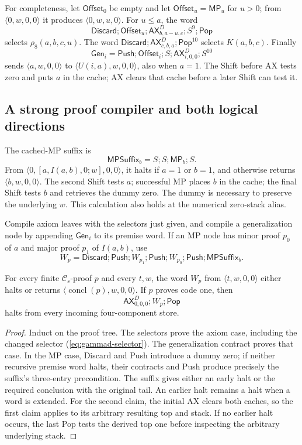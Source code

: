 For completeness, let \(\mathsf{Offset}_0\) be empty and let
\(\mathsf{Offset}_u=\mathsf{MP}_u\) for \(u>0\); from
\(\langle0,w,0,0\rangle\) it produces
\(\langle0,w,u,0\rangle\).  For \(u\le a\), the word
\[
 \mathsf{Discard};\mathsf{Offset}_u;
 \mathsf{AX}^{D}_{b,a-u,c};S^9;\mathsf{Pop}
\]
selects \(\rho_8(a,b,c,u)\).  The word
\(\mathsf{Discard};\mathsf{AX}^{D}_{c,b,a};\mathsf{Pop}^{10}\)
selects \(K(a,b,c)\).  Finally
\[
 \mathsf{Gen}_i=\mathsf{Push};\mathsf{Offset}_i;S;
                                      \mathsf{AX}^{D}_{i,0,0};S^{10}
\]
sends \(\langle a,w,0,0\rangle\) to
\(\langle U(i,a),w,0,0\rangle\), also when \(a=1\).
The Shift before AX tests zero and puts \(a\) in the cache; AX
clears that cache before a later Shift can test it.

\subsection{A strong proof compiler and both logical directions}

The cached-MP suffix is
\[
 \mathsf{MPSuffix}_b=S;S;\mathsf{MP}_b;S.
\]
From \(\langle0,[a,I(a,b),0;w],0,0\rangle\), it halts if
\(a=1\) or \(b=1\), and otherwise returns
\(\langle b,w,0,0\rangle\).  The second Shift tests \(a\);
successful MP places \(b\) in the cache; the final Shift tests \(b\)
and retrieves the dummy zero.  The dummy is necessary to preserve
the underlying \(w\).  This calculation also holds at the numerical
zero-stack alias.

Compile axiom leaves with the selectors just given, and compile a
generalization node by appending \(\mathsf{Gen}_i\) to its premise
word.  If an MP node has minor proof \(p_0\) of \(a\) and major
proof \(p_1\) of \(I(a,b)\), use
\[
 W_p=\mathsf{Discard};\mathsf{Push};
     W_{p_1};\mathsf{Push};W_{p_0};\mathsf{Push};\mathsf{MPSuffix}_b.
\]

\begin{lemma}
For every finite \(\mathcal C_s\)-proof \(p\) and every \(t,w\),
the word \(W_p\) from \(\langle t,w,0,0\rangle\) either halts
or returns \(\langle\operatorname{concl}(p),w,0,0\rangle\).
If \(p\) proves code one, then
\[
  \mathsf{AX}^{D}_{0,0,0};W_p;\mathsf{Pop}
\]
halts from every incoming four-component store.
\end{lemma}
\begin{proof}
Induct on the proof tree.  The selectors prove the axiom case, including
the changed selector (\ref{eq:gammad-selector}).  The generalization
contract proves that case.  In the MP case, Discard and Push introduce
a dummy zero; if neither recursive premise word halts, their contracts
and Push produce precisely the suffix's three-entry precondition.
The suffix gives either an early halt or the required conclusion with
the original tail.  An earlier halt remains a halt when a word is
extended.  For the second claim, the initial AX clears both caches,
so the first claim applies to its arbitrary resulting top and stack.
If no earlier halt occurs, the last Pop tests the derived top one
before inspecting the arbitrary underlying stack.
\end{proof}

